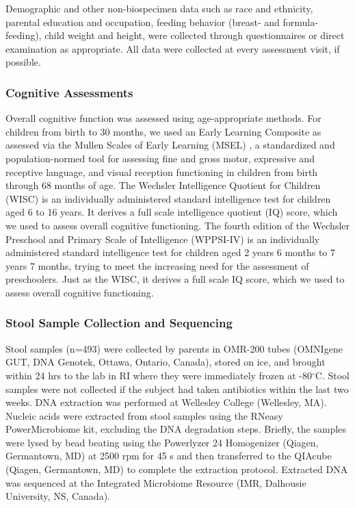 \documentclass[a4paper]{article}
\begin{document}
Demographic and other non-biospecimen data such as race and ethnicity,
parental education and occupation, feeding behavior (breast- and
formula-feeding), child weight and height, were collected through
questionnaires or direct examination as appropriate. All data were
collected at every assessment visit, if possible.

\subsubsection{Cognitive Assessments}

Overall cognitive function was assessed using age-appropriate methods.
For children from birth to 30 months, we used an Early Learning
Composite as assessed via the Mullen Scales of Early Learning (MSEL)
\citep{mullenMullenScalesEarly1995},
 a standardized and population-normed tool for assessing fine and
gross motor, expressive and receptive language, and visual reception
functioning in children from birth through 68 months of age. The
Wechsler Intelligence Quotient for Children (WISC)
\citep{wechslerWechslerPreschoolPrimary2012}
is an individually administered standard intelligence test for children
aged 6 to 16 years. It derives a full scale intelligence quotient (IQ)
score, which we used to assess overall cognitive functioning. The fourth
edition of the Wechsler Preschool and Primary Scale of Intelligence
(WPPSI-IV) is an individually administered standard intelligence test
for children aged 2 years 6 months to 7 years 7 months, trying to meet
the increasing need for the assessment of preschoolers. Just as the
WISC, it derives a full scale IQ score, which we used to assess overall
cognitive functioning.

\subsubsection{Stool Sample Collection and Sequencing}

Stool samples (n=493) were collected by parents in OMR-200 tubes
(OMNIgene GUT, DNA Genotek, Ottawa, Ontario, Canada), stored on ice, and
brought within 24 hrs to the lab in RI where they were immediately
frozen at -80$^{\circ}$C. Stool samples were not collected if the subject had
taken antibiotics within the last two weeks. DNA extraction was
performed at Wellesley College (Wellesley, MA). Nucleic acids were
extracted from stool samples using the RNeasy PowerMicrobiome kit,
excluding the DNA degradation steps. Briefly, the samples were lysed by
bead beating using the Powerlyzer 24 Homogenizer (Qiagen, Germantown,
MD) at 2500 rpm for 45 s and then transferred to the QIAcube (Qiagen,
Germantown, MD) to complete the extraction protocol. Extracted DNA was
sequenced at the Integrated Microbiome Resource (IMR, Dalhousie
University, NS, Canada).
\end{document}
